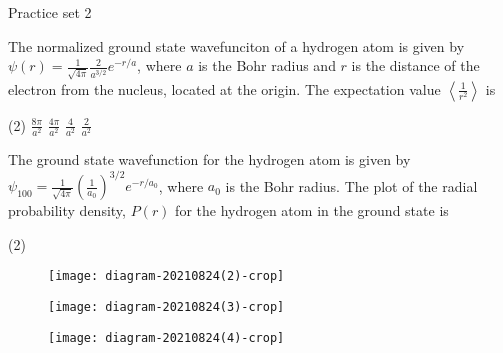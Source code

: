 \newpage
\begin{abox}
	Practice set 2
	\end{abox}
\begin{enumerate}
\begin{minipage}{\textwidth}
	\item The normalized ground state wavefunciton of a hydrogen atom is given by $\psi(r)=\frac{1}{\sqrt{4 \pi}} \frac{2}{a^{3 / 2}} e^{-r / a}$, where $a$ is the Bohr radius and $r$ is the distance of the electron from the nucleus, located at the origin. The expectation value $\left\langle\frac{1}{r^{2}}\right\rangle$ is
\end{minipage}
\begin{tasks}(2)
	\task[\textbf{A.}] $\frac{8 \pi}{a^{2}}$
	\task[\textbf{B.}]$\frac{4 \pi}{a^{2}}$
	\task[\textbf{C.}]$\frac{4}{a^{2}}$
	\task[\textbf{D.}]$\frac{2}{a^{2}}$
\end{tasks}
\begin{minipage}{\textwidth}
	\item The ground state wavefunction for the hydrogen atom is given by $\psi_{100}=\frac{1}{\sqrt{4 \pi}}\left(\frac{1}{a_{0}}\right)^{3 / 2} e^{-r / a_{0}}$, where $a_{0}$ is the Bohr radius. The plot of the radial probability density, $P(r)$ for the hydrogen atom in the ground state is
\end{minipage}
\begin{tasks}(2)
	\task[\textbf{A.}]\begin{figure}[H]
		\centering
		\texttt{[image: diagram-20210824(2)-crop]}
		
	\end{figure}
	\task[\textbf{B.}]\begin{figure}[H]
		\centering
		\texttt{[image: diagram-20210824(3)-crop]}
		
	\end{figure}
	\task[\textbf{C.}]\begin{figure}[H]
		\centering
		\texttt{[image: diagram-20210824(4)-crop]}
		

\end{figure}
\end{tasks}
\end{enumerate}

